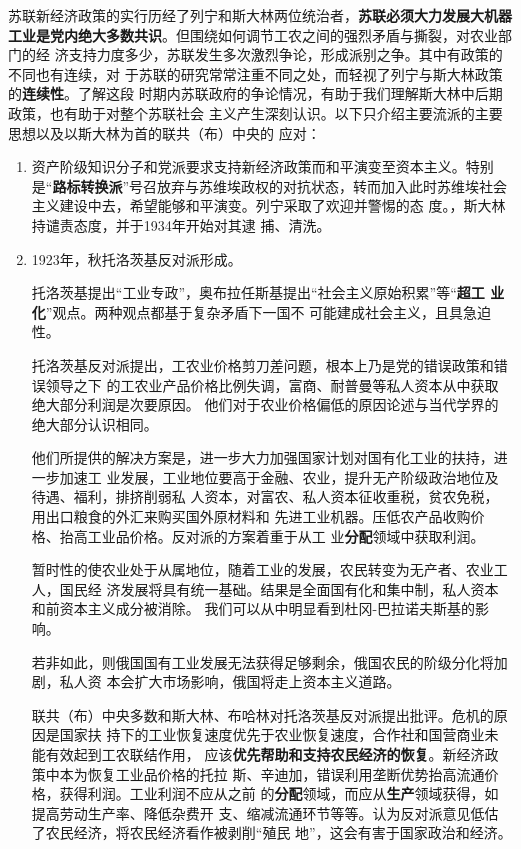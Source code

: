 苏联新经济政策的实行历经了列宁和斯大林两位统治者，\textbf{苏联必须大力发展大机器
  工业是党内绝大多数共识}。但围绕如何调节工农之间的强烈矛盾与撕裂，对农业部门的经
济支持力度多少，苏联发生多次激烈争论，形成派别之争。其中有政策的不同也有连续，对
于苏联的研究常常注重不同之处，而轻视了列宁与斯大林政策的\textbf{连续性}。了解这段
时期内苏联政府的争论情况，有助于我们理解斯大林中后期政策，也有助于对整个苏联社会
主义产生深刻认识。以下只介绍主要流派的主要思想以及以斯大林为首的联共（布）中央的
应对：
\begin{enumerate}
\item 资产阶级知识分子和党派要求支持新经济政策而和平演变至资本主义。特别
  是``\textbf{路标转换派}''号召放弃与苏维埃政权的对抗状态，转而加入此时苏维埃社会
  主义建设中去，希望能够和平演变。列宁采取了欢迎并警惕的态
  度。，斯大林持谴责态度，并于1934年开始对其逮
  捕、清洗。\cite{wenyilubiao}

\item 1923年，秋托洛茨基反对派形成。

  托洛茨基提出“工业专政”，奥布拉任斯基提出“社会主义原始积累”等``\textbf{超工
    业化}''观点。两种观点都基于复杂矛盾下一国不
  可能建成社会主义，且具急迫性。

  托洛茨基反对派提出，工农业价格剪刀差问题，根本上乃是党的错误政策和错误领导之下
  的工农业产品价格比例失调，富商、耐普曼等私人资本从中获取绝大部分利润是次要原因。
  他们对于农业价格偏低的原因论述与当代学界的绝大部分认识相同。

  他们所提供的解决方案是，进一步大力加强国家计划对国有化工业的扶持，进一步加速工
  业发展，工业地位要高于金融、农业，提升无产阶级政治地位及待遇、福利，排挤削弱私
  人资本，对富农、私人资本征收重税，贫农免税，用出口粮食的外汇来购买国外原材料和
  先进工业机器。压低农产品收购价格、抬高工业品价格。反对派的方案着重于从工
  业\textbf{分配}领域中获取利润。

  暂时性的使农业处于从属地位，随着工业的发展，农民转变为无产者、农业工人，国民经
  济发展将具有统一基础。结果是全面国有化和集中制，私人资本和前资本主义成分被消除。
  我们可以从中明显看到杜冈-巴拉诺夫斯基的影响。

  若非如此，则俄国国有工业发展无法获得足够剩余，俄国农民的阶级分化将加剧，私人资
  本会扩大市场影响，俄国将走上资本主义道路。

  联共（布）中央多数和斯大林、布哈林对托洛茨基反对派提出批评。危机的原因是国家扶
  持下的工业恢复速度优先于农业恢复速度，合作社和国营商业未能有效起到工农联结作用，
  应该\textbf{优先帮助和支持农民经济的恢复}。新经济政策中本为恢复工业品价格的托拉
  斯、辛迪加，错误利用垄断优势抬高流通价格，获得利润。工业利润不应从之前
  的\textbf{分配}领域，而应从\textbf{生产}领域获得，如提高劳动生产率、降低杂费开
  支、缩减流通环节等等。认为反对派意见低估了农民经济，将农民经济看作被剥削``殖民
  地''，这会有害于国家政治和经济。


\end{enumerate}
